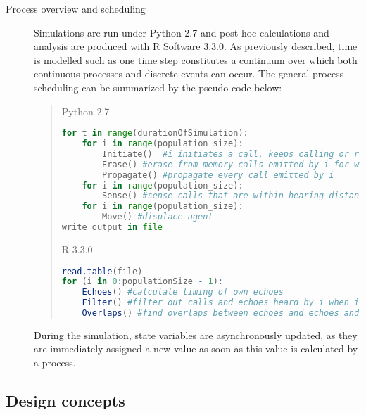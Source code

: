 \documentclass[12pt]{article}
\begin{document}
\begin{description}
\item [Process overview and scheduling] Simulations are run under Python 2.7 and post-hoc calculations and analysis are produced with R Software 3.3.0. As previously described, time is modelled such as one time step constitutes a continuum over which both continuous processes and discrete events can occur. The general process scheduling can be summarized by the pseudo-code below:

\begin{quote}
Python 2.7
\begin{lstlisting}[language = Python]
for t in range(durationOfSimulation):
	for i in range(population_size):
		Initiate()  #i initiates a call, keeps calling or remains silent
		Erase() #erase from memory calls emitted by i for which the intensity is now too faint to be heard
		Propagate() #propagate every call emitted by i
	for i in range(population_size):
		Sense() #sense calls that are within hearing distance
	for i in range(population_size):
		Move() #displace agent
write output in file
\end{lstlisting}
R 3.3.0
\begin{lstlisting}[language = R]
read.table(file)
for (i in 0:populationSize - 1):
	Echoes() #calculate timing of own echoes
	Filter() #filter out calls and echoes heard by i when it was calling 
	Overlaps() #find overlaps between echoes and echoes and calls
\end{lstlisting}
\end{quote}

During the simulation, state variables are asynchronously updated, as they are immediately assigned a new value as soon as this value is calculated by a process. 

\end{description}

\subsection{Design concepts}
\end{document}
